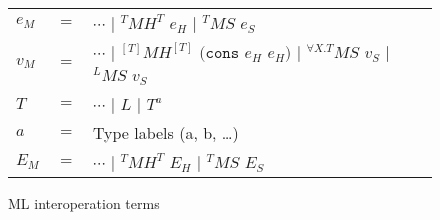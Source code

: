 \begin{figure}
\label{mit}
\caption{ML interoperation terms}
\begin{center}
\begin{tabular}{lcl}
$e_{M}$ & $=$ & $\cdots$ $\vert$ $^{T}MH^{T}$ $e_{H}$ $\vert$ $^{T}MS$ $e_{S}$ \\
$v_{M}$ & $=$ & $\cdots$ $\vert$ $^{[T]}MH^{[T]}$ $(\mathtt{cons}$ $e_{H}$ $e_{H})$ $\vert$ $^{\forall X.T}MS$ $v_{S}$ $\vert$ $^{L}MS$ $v_{S}$ \\
$T$ & $=$ & $\cdots$ $\vert$ $L$ $\vert$ $T^{a}$ \\
$a$ & $=$ & Type labels (a, b, \ldots) \\
$E_{M}$ & $=$ & $\cdots$ $\vert$ $^{T}MH^{T}$ $E_{H}$ $\vert$ $^{T}MS$ $E_{S}$
\end{tabular}
\end{center}
\end{figure}